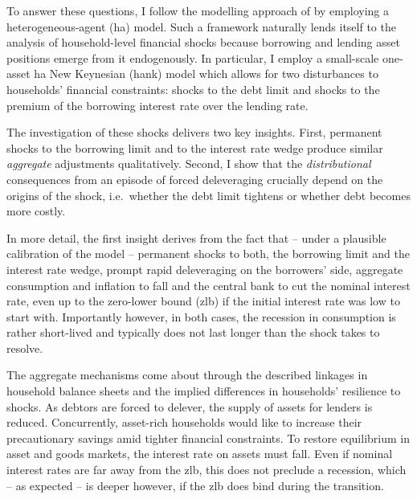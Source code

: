 \documentclass[12pt]{article} %
\numberwithin{equation}{section} %
\numberwithin{figure}{section}
\numberwithin{table}{section}
\begin{document}
To answer these questions, I follow the modelling approach of \textcite{gl2017} by employing a heterogeneous-agent (\Gls{ha}) model. Such a framework naturally lends itself to the analysis of household-level financial shocks because borrowing and lending asset positions emerge from it endogenously. In particular, I employ a small-scale one-asset \Gls{ha} New Keynesian (\Gls{hank}) model which allows for two disturbances to households' financial constraints: shocks to the debt limit and shocks to the premium of the borrowing interest rate over the lending rate.



The investigation of these shocks delivers two key insights. First, permanent shocks to the borrowing limit and to the interest rate wedge produce similar \textit{aggregate} adjustments qualitatively. Second, I show that the \textit{distributional} consequences from an episode of forced deleveraging crucially depend on the origins of the shock, i.e.~whether the debt limit tightens or whether debt becomes more costly.

In more detail, the first insight derives from the fact that -- under a plausible calibration of the model -- permanent shocks to both, the borrowing limit and the interest rate wedge, prompt rapid deleveraging on the borrowers' side, aggregate consumption and inflation to fall and the central bank to cut the nominal interest rate, even up to the zero-lower bound (\Gls{zlb}) if the initial interest rate was low to start with. Importantly however, in both cases, the recession in consumption is rather short-lived and typically does not last longer than the shock takes to resolve. %

The aggregate mechanisms come about through the described linkages in household balance sheets and the implied differences in households' resilience to shocks. As debtors are forced to delever, the supply of assets for lenders is reduced. Concurrently, asset-rich households would like to increase their precautionary savings amid tighter financial constraints. To restore equilibrium in asset and goods markets, the interest rate on assets must fall. Even if nominal interest rates are far away from the \Gls{zlb}, this does not preclude a recession, which -- as expected -- is deeper however, if the \Gls{zlb} does bind during the transition. 
\end{document}
